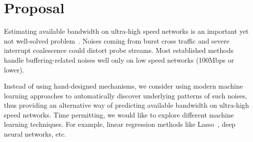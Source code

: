 \section{Proposal}
\label{sec:proposal}

Estimating available bandwidth on ultra-high speed networks is an important yet
not well-solved problem~\cite{yin2014}. Noises coming from burst cross traffic
and severe interrupt coalescence could distort probe streams. Most established
methods handle buffering-related noises well only on low speed networks (100Mbps
or lower).

Instead of using hand-designed mechanisms, we consider using modern machine
learning approaches to automatically discover underlying patterns of such
noises, thus providing an alternative way of predicting available bandwidth on
ultra-high speed networks. Time permitting, we would like to explore different
machine learning techniques. For example, linear regression methods like
Lasso~\cite{Tibshirani1996}, deep neural networks, etc.
